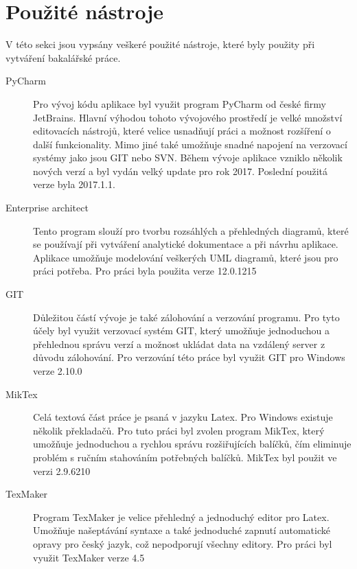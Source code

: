 \documentclass[thesis=B,czech]{resources/FITthesis}[2012/06/26]
\begin{document}
\section{Použité nástroje}
V této sekci jsou vypsány veškeré použité nástroje, které byly použity při vytváření bakalářské práce.
\begin{description}
\item[PyCharm] Pro vývoj kódu aplikace byl využit program PyCharm od české firmy JetBrains. Hlavní výhodou tohoto vývojového prostředí je velké množství editovacích nástrojů, které velice usnadňují práci a možnost rozšíření o další funkcionality. Mimo jiné také umožňuje snadné napojení na verzovací systémy jako jsou GIT nebo SVN. Během vývoje aplikace vzniklo několik nových verzí a byl vydán velký update pro rok 2017. Poslední použitá verze byla 2017.1.1.

\item[Enterprise architect] Tento program slouží pro tvorbu rozsáhlých a přehledných diagramů, které se používají při vytváření analytické dokumentace a při návrhu aplikace. Aplikace umožňuje modelování veškerých UML diagramů, které jsou pro práci potřeba. Pro práci byla použita verze 12.0.1215

\item[GIT] Důležitou částí vývoje je také zálohování a verzování programu. Pro tyto účely byl využit verzovací systém GIT, který umožňuje jednoduchou a přehlednou správu verzí a možnost ukládat data na vzdálený server z důvodu zálohování. Pro verzování této práce byl využit GIT pro Windows verze 2.10.0

\item[MikTex] Celá textová část práce je psaná v jazyku Latex. Pro Windows existuje několik překladačů. Pro tuto práci byl zvolen program MikTex, který umožňuje jednoduchou a rychlou správu rozšiřujících balíčků, čím eliminuje problém s ručním stahováním potřebných balíčků. MikTex byl použit ve verzi 2.9.6210

\item[TexMaker] Program TexMaker je velice přehledný a jednoduchý editor pro Latex. Umožňuje našeptávání syntaxe a také jednoduché zapnutí automatické opravy pro český jazyk, což nepodporují všechny editory. Pro práci byl využit TexMaker verze 4.5
\end{description}
\end{document}
